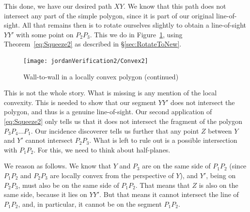 \linebreak

This done, we have our desired path $XY$. We know that this path does not intersect any part of the simple polygon, since it is part of our original line-of-sight. All that remains then is to rotate ourselves slightly to obtain a line-of-sight $YY'$ with some point on $P_2P_3$. This we do in Figure~\ref{fig:Convex2}, using Theorem~\ref{eq:Squeeze2} as described in \S\ref{sec:RotateToNew}. 

\begin{figure}
\centering\texttt{[image: jordanVerification2/Convex2]}
\caption{Wall-to-wall in a locally convex polygon (continued)}
\label{fig:Convex2}
\end{figure}

This is not the whole story. What is missing is any mention of the local convexity. This is needed to show that our segment $YY'$ does not intersect the polygon, and thus is a genuine line-of-sight. Our second application of \eqref{eq:Squeeze2} only tells us that it does not intersect the fragment of the polygon $P_3P_4\ldots P_1$. Our incidence discoverer tells us further that any point $Z$ between $Y$ and $Y'$ cannot intersect $P_2P_3$. What is left to rule out is a possible intersection with $P_1P_2$. For this, we need to think about half-planes. 

We reason as follows. We know that $Y$ and $P_3$ are on the same side of $P_1P_2$ (since $P_1P_2$ and $P_2P_3$ are locally convex from the perspective of $Y$), and $Y'$, being on $P_2P_3$, must also be on the same side of $P_1P_2$. That means that $Z$ is also on the same side, because it lies on $YY'$. But that means it cannot intersect the line of $P_1P_2$, and, in particular, it cannot be on the segment $P_1P_2$.

